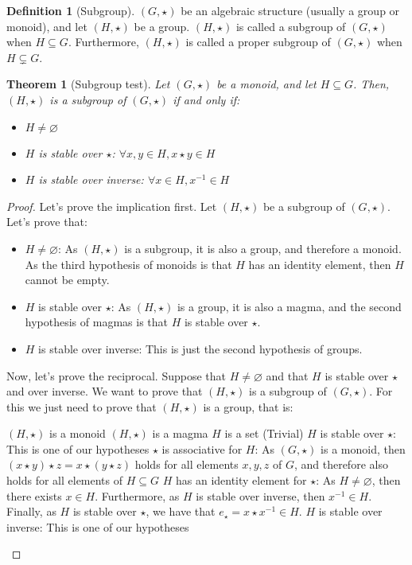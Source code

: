 \documentclass{article}
\newtheorem{theorem}{Theorem}[section]
\theoremstyle{definition}
\newtheorem{definition}{Definition}[section]
\theoremstyle{remark}
\theoremstyle{example}
\begin{document}
\begin{definition}[Subgroup]
		$(G, \star)$ be an algebraic structure (usually a group or monoid), and let $(H, \star)$ be a group. $(H, \star)$ is called a subgroup of $(G, \star)$ when $H \subseteq G$. Furthermore, $(H, \star)$ is called a proper subgroup of $(G, \star)$ when $H \subsetneq G$.
\end{definition}

\begin{theorem}[Subgroup test]
		Let $(G, \star)$ be a monoid, and let $H \subseteq G$. Then, $(H, \star)$ is a subgroup of $(G, \star)$ if and only if:
		\begin{itemize}
				\item $H \neq \varnothing$
				\item $H$ is stable over $\star$: $\forall x, y \in H, x \star y \in H$
				\item $H$ is stable over inverse: $\forall x \in H, x^{-1} \in H$
		\end{itemize}
\end{theorem}

\begin{proof}
		Let's prove the implication first. Let $(H, \star)$ be a subgroup of $(G, \star)$. Let's prove that:
		\begin{itemize}
				\item $H \neq \varnothing$: As $(H, \star)$ is a subgroup, it is also a group, and therefore a monoid. As the third hypothesis of monoids is that $H$ has an identity element, then $H$ cannot be empty.
				\item $H$ is stable over $\star$: As $(H, \star)$ is a group, it is also a magma, and the second hypothesis of magmas is that $H$ is stable over $\star$.
				\item $H$ is stable over inverse: This is just the second hypothesis of groups.
		\end{itemize}
		
		Now, let's prove the reciprocal. Suppose that $H \neq \varnothing$ and that $H$ is stable over $\star$ and over inverse. We want to prove that $(H, \star)$ is a subgroup of $(G, \star)$. For this we just need to prove that $(H, \star)$ is a group, that is:
		\begin{outline}
				\1 $(H, \star)$ is a monoid
						\2 $(H, \star)$ is a magma
								\3 $H$ is a set (Trivial)
								\3 $H$ is stable over $\star$: This is one of our hypotheses
						\2 $\star$ is associative for $H$: As $(G, \star)$ is a monoid, then $(x \star y) \star z = x \star (y \star z)$ holds for all elements $x, y, z$ of $G$, and therefore also holds for all elements of $H \subseteq G$
						\2 $H$ has an identity element for $\star$: As $H \neq \varnothing$, then there exists $x \in H$. Furthermore, as $H$ is stable over inverse, then $x^{-1} \in H$. Finally, as $H$ is stable over $\star$, we have that $e_\star = x \star x^{-1} \in H$.
				\1 $H$ is stable over inverse: This is one of our hypotheses
		\end{outline}
\end{proof}
\end{document}
